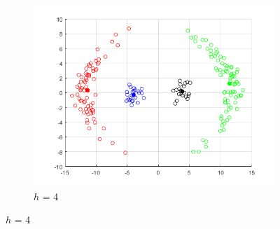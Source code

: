 \documentclass[12pt]{article}
\begin{document}
\begin{figure}[H]
\begin{subfigure}{0.25\textwidth}
  \includegraphics[width=\linewidth]{figs/1-b-meanshift-c-4.png}
  \caption{$h$ = 4}
  \label{fig:3}
\end{subfigure}


\end{figure}
\end{document}
